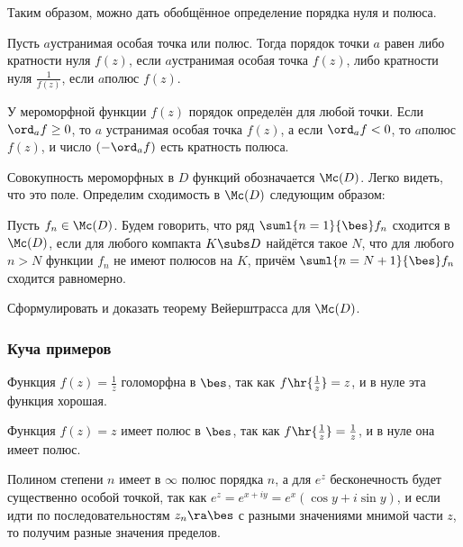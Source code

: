 \documentclass[a4paper]{article}
\begin{document}
Таким образом, можно дать обобщённое определение порядка нуля и полюса.

\begin{df}
Пусть $a$\т устранимая особая точка или полюс. Тогда порядок точки $a$ равен либо кратности нуля $f(z)$,
если $a$\т устранимая особая точка $f(z)$, либо кратности нуля $\frac{1}{f(z)}$, если $a$\т полюс $f(z)$.
\end{df}

У мероморфной функции $f(z)$ порядок определён для любой точки. Если $\ord_a f\ge 0$, то $a$\т
устранимая особая точка $f(z)$, а если  $\ord_a f < 0$, то $a$\т полюс $f(z)$, и число $(-\ord_a f)$
есть кратность полюса.

Совокупность мероморфных в $D$ функций обозначается $\Mc(D)$. Легко видеть, что это поле.
Определим сходимость в $\Mc(D)$ следующим образом:

\begin{df}
Пусть $f_n\in \Mc(D)$. Будем говорить, что ряд $\suml{n=1}{\bes}f_n$ сходится в $\Mc(D)$, если для любого компакта
$K \subs D$ найдётся такое $N$, что для любого $n>N$ функции $f_n$ не имеют полюсов на $K$, причём
$\suml{n=N+1}{\bes}f_n$ сходится равномерно.
\end{df}

\begin{problem}
Сформулировать и доказать теорему Вейерштрасса для $\Mc(D)$.
\end{problem}

\subsubsection{Куча примеров}

\begin{ex}
Функция $f(z)=\frac1z$ голоморфна в $\bes$, так как $f\hr{\frac1z}=z$, и в нуле эта функция хорошая.
\end{ex}

\begin{ex}
Функция $f(z)=z$ имеет полюс в $\bes$, так как $f\hr{\frac1z}=\frac1z$, и в нуле она имеет полюс.
\end{ex}

\begin{ex}
Полином степени $n$ имеет в $\infty$ полюс порядка $n$, а для $e^z$ бесконечность будет существенно особой
точкой, так как $e^z = e^{x+iy} = e^x(\cos y + i \sin y)$, и если идти по последовательностям $z_n\ra\bes$
с разными значениями мнимой части $z$, то получим разные значения пределов.
\end{ex}
\end{document}
